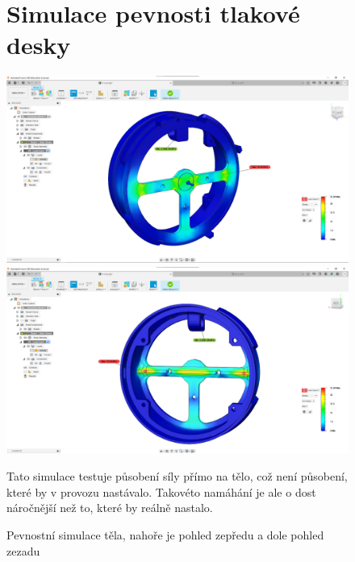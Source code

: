 \begin{figure}
\section{Simulace pevnosti tlakové desky}
    \centering
    \includegraphics[width=370pt]{kapitoly/obrazky/E4/machanika_tlakove_desky/simulace/F100N,primo,uprostred,pohled_zepredu.png}
    \includegraphics[width=370pt]{kapitoly/obrazky/E4/machanika_tlakove_desky/simulace/F100N,primo,uprostred,pohled_zezadu.png}
    \caption{Pevnostní simulace těla, nahoře je pohled zepředu a dole pohled zezadu \centering}
    Tato simulace testuje působení síly přímo na tělo, což není působení, které by v provozu nastávalo. Takovéto namáhání je ale o dost náročnější
    než to, které by reálně nastalo.
    \label{fig:E4-simulace_tela} %
\end{figure}

